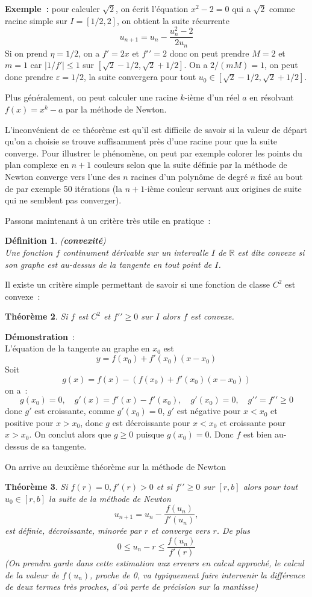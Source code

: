 \documentclass[a4paper,11pt]{book}
\newtheorem{thm}{Théorème}
\newtheorem{defn}[thm]{D\'efinition}
\begin{document}
\begin{giacjshere}
{\bf Exemple~:} pour calculer $\sqrt{2}$, on écrit l'équation $x^2-2=0$
qui a $\sqrt{2}$ comme racine simple sur $I=[1/2,2]$, 
on obtient la suite récurrente
\[ u_{n+1} = u_n - \frac{u_n^2-2}{2u_n} \]
Si on prend $\eta=1/2$, on a $f'=2x$ et $f'{'}=2$
donc on peut prendre $M=2$ et $m=1$ car $|1/f'|\leq 1$ sur 
$[\sqrt{2}-1/2,\sqrt{2}+1/2]$. On a $2/(mM)=1$, on peut donc 
prendre $\varepsilon=1/2$, la suite convergera pour tout 
$ u_0 \in [\sqrt{2}-1/2,\sqrt{2}+1/2]$.

Plus généralement, on peut calculer une racine $k$-ième d'un réel $a$
en résolvant $f(x)=x^k-a$ par la méthode de Newton.

L'inconvénient de ce th\'eor\`eme
est qu'il est difficile de savoir si la valeur de départ qu'on
a choisie se trouve suffisamment près d'une racine pour que
la suite converge. Pour illustrer le phénomène, 
on peut par exemple colorer les points du plan
complexe en $n+1$ couleurs selon que la suite définie par la méthode
de Newton converge vers l'une des $n$ racines d'un polynôme de degré
$n$ fixé au bout de par exemple 50 itérations (la $n+1$-ième couleur
servant aux origines de suite qui ne semblent pas converger).

Passons maintenant à un critère tr\`es utile en pratique~:
\begin{defn} ({\bf convexité})\\
Une fonction $f$ continument dérivable sur un intervalle $I$ de $\mathbb{R}$
est dite convexe si son graphe est au-dessus de la tangente en tout point
de $I$.
\end{defn}
Il existe un crit\`ere simple permettant de savoir si
une fonction de classe $C^2$ est convexe~:
\begin{thm}
Si $f$ est $C^2$ et $f'{'} \geq 0$ sur $I$ alors $f$ est convexe.
\end{thm}
{\bf Démonstration}~:\\
L'équation de la tangente au graphe en $x_0$ est 
\[ y=f(x_0)+f'(x_0)(x-x_0) \]
Soit
\[ g(x)=f(x)-(f(x_0)+f'(x_0)(x-x_0)) \]
on a~:
\[ g(x_0)=0, \quad g'(x)=f'(x)-f'(x_0), \quad g'(x_0)=0, 
\quad g'{'}=f'{'} \geq 0 \]
donc $g'$ est croissante, comme $g'(x_0)=0$, $g'$ est négative
pour $x<x_0$ et positive pour $x>x_0$, donc $g$ est décroissante
pour $x<x_0$ et croissante pour $x>x_0$. On conclut alors que
$g \geq 0$ puisque $g(x_0)=0$. Donc $f$ est bien au-dessus
de sa tangente.

On arrive au deuxième théorème sur la méthode de Newton
\begin{thm} 
Si $f(r)=0, f'(r)>0$ et si $f'{'} \geq 0$ sur $[r,b]$ alors
pour tout $u_0 \in [r,b]$ la suite de la méthode de Newton
\[ u_{n+1} = u_n -\frac{f(u_n)}{f'(u_n)},  \]
est définie, décroissante, minorée par $r$ et converge vers 
$r$. De plus
\[ 0 \leq u_n -r \leq \frac{f(u_n)}{f'(r)} \]
(On prendra garde dans cette estimation aux erreurs en calcul
approch\'e, le calcul de la valeur de $f(u_n)$, proche de 0, va typiquement
faire intervenir la diff\'erence de deux termes tr\`es proches,
d'o\`u perte de pr\'ecision sur la mantisse)
\end{thm}


\end{giacjshere}
\end{document}
